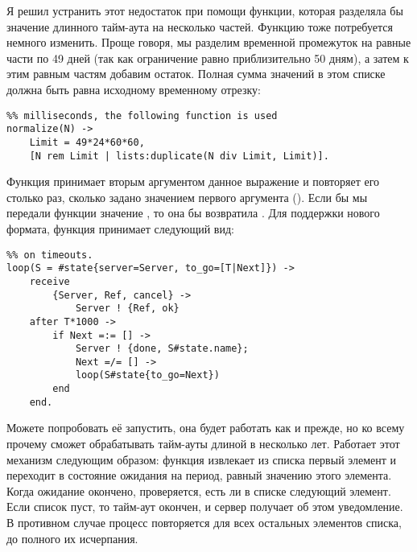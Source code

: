 Я решил устранить этот недостаток при помощи функции, которая разделяла бы значение длинного тайм\--аута на несколько частей.
Функцию  тоже потребуется немного изменить.
Проще говоря, мы разделим временной промежуток на равные части по 49 дней (так как ограничение равно приблизительно 50 дням), а затем к этим равным частям добавим остаток.
Полная сумма значений в этом списке должна быть равна исходному временному отрезку:
\begin{lstlisting}[style=erlang]
%% Because Erlang is limited to about 49 days (49*24*60*60*1000) in
%% milliseconds, the following function is used
normalize(N) ->
    Limit = 49*24*60*60,
    [N rem Limit | lists:duplicate(N div Limit, Limit)].
\end{lstlisting}

Функция  принимает вторым аргументом данное выражение и повторяет его столько раз, сколько задано значением первого аргумента ().
Если бы мы передали функции  значение , то она бы возвратила \ops{[4,4233600,423360]}.
Для поддержки нового формата, функция  принимает следующий вид:
\begin{lstlisting}[style=erlang]
%% Loop uses a list for times in order to go around the ~49 days limit
%% on timeouts.
loop(S = #state{server=Server, to_go=[T|Next]}) ->
    receive
        {Server, Ref, cancel} ->
            Server ! {Ref, ok}
    after T*1000 ->
        if Next =:= [] ->
            Server ! {done, S#state.name};
            Next =/= [] ->
            loop(S#state{to_go=Next})
        end
    end.
\end{lstlisting}

Можете попробовать её запустить, она будет работать как и прежде, но ко всему прочему сможет обрабатывать тайм\--ауты длиной в несколько лет.
Работает этот механизм следующим образом: функция извлекает из списка  первый элемент и переходит в состояние ожидания на период, равный значению этого элемента.
Когда ожидание окончено, проверяется, есть ли в списке следующий элемент.
Если список пуст, то тайм\--аут окончен, и сервер получает об этом уведомление.
В противном случае процесс повторяется для всех остальных элементов списка, до полного их исчерпания.

